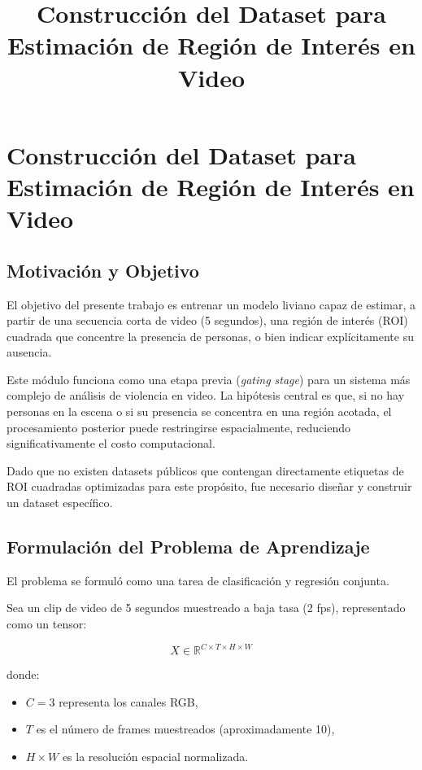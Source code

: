 \documentclass[12pt,a4paper]{article}
\title{Construcción del Dataset para Estimación de Región de Interés en Video}
\author{}
\date{}
\begin{document}
\maketitle

\section{Construcción del Dataset para Estimación de Región de Interés en Video}

\subsection{Motivación y Objetivo}

El objetivo del presente trabajo es entrenar un modelo liviano capaz de estimar, a partir de una secuencia corta de video (5 segundos), una región de interés (ROI) cuadrada que concentre la presencia de personas, o bien indicar explícitamente su ausencia.

Este módulo funciona como una etapa previa (\textit{gating stage}) para un sistema más complejo de análisis de violencia en video. La hipótesis central es que, si no hay personas en la escena o si su presencia se concentra en una región acotada, el procesamiento posterior puede restringirse espacialmente, reduciendo significativamente el costo computacional.

Dado que no existen datasets públicos que contengan directamente etiquetas de ROI cuadradas optimizadas para este propósito, fue necesario diseñar y construir un dataset específico.

\subsection{Formulación del Problema de Aprendizaje}

El problema se formuló como una tarea de clasificación y regresión conjunta.

Sea un clip de video de 5 segundos muestreado a baja tasa (2 fps), representado como un tensor:

\[
X \in \mathbb{R}^{C \times T \times H \times W}
\]

donde:
\begin{itemize}
    \item $C = 3$ representa los canales RGB,
    \item $T$ es el número de frames muestreados (aproximadamente 10),
    \item $H \times W$ es la resolución espacial normalizada.
\end{itemize}
\end{document}
